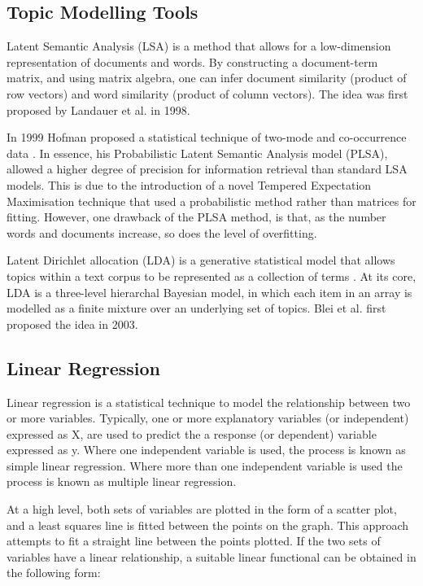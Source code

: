 \subsection{Topic Modelling Tools}

Latent Semantic Analysis (LSA) is a method that allows for a low-dimension representation of documents and words. By constructing a document-term matrix, and using matrix algebra, one can infer document similarity (product of row vectors) and word similarity (product of column vectors). The idea was first proposed by Landauer et al. in 1998\cite{landauer1998introduction}.

In 1999 Hofman proposed a statistical technique of two-mode and co-occurrence data \cite{hofmann1999probabilistic}. In essence, his Probabilistic Latent Semantic Analysis model (PLSA), allowed a higher degree of precision for information retrieval than standard LSA models. This is due to the introduction of a novel Tempered Expectation Maximisation technique that used a probabilistic method rather than matrices for fitting. However, one drawback of the PLSA method, is that, as the number words and documents increase, so does the level of overfitting.

Latent Dirichlet allocation (LDA) is a generative statistical model that allows topics within a text corpus to be represented as a collection of terms \cite{blei2003latent}. At its core, LDA is a three-level hierarchal Bayesian model, in which each item in an array is modelled as a finite mixture over an underlying set of topics. Blei et al. first proposed the idea in 2003.

\subsection{Linear Regression}

Linear regression is a statistical technique to model the relationship between two or more variables. Typically, one or more explanatory variables (or independent) expressed as X, are used to predict the a response (or dependent) variable expressed as y. Where one independent variable is used, the process is known as simple linear regression. Where more than one independent variable is used the process is known as multiple linear regression.

At a high level, both sets of variables are plotted in the form of a scatter plot, and a least squares line is fitted between the points on the graph. This approach attempts to fit a straight line between the points plotted. If the two sets of variables have a linear relationship, a suitable linear functional can be obtained in the following form:

